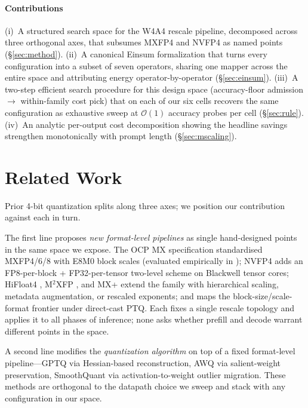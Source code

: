 \documentclass[conference]{IEEEtran}
\begin{document}
\paragraph*{Contributions}
(i)~A structured search space for the W4A4 rescale pipeline,
decomposed across three orthogonal axes, that subsumes MXFP4 and
NVFP4 as named points (\S\ref{sec:method}).
(ii)~A canonical Einsum formalization that turns every
configuration into a subset of seven operators, sharing one
mapper across the entire space and attributing energy
operator-by-operator (\S\ref{sec:einsum}).
(iii)~A two-step efficient search procedure for this design space
(accuracy-floor admission $\to$ within-family cost pick) that
on each of our six cells recovers the same configuration as
exhaustive sweep at $\mathcal{O}(1)$ accuracy probes per cell
(\S\ref{sec:rule}).
(iv)~An analytic per-output cost decomposition showing the
headline savings strengthen monotonically with prompt length
(\S\ref{sec:mscaling}).

\section{Related Work}
\label{sec:related}

Prior 4-bit quantization splits along three axes; we position our
contribution against each in turn.

The first line proposes \emph{new format-level pipelines} as
single hand-designed points in the same space we expose.  The
OCP MX specification \cite{mxfp4} standardised MXFP4/6/8 with
E8M0 block scales (evaluated empirically in
\cite{microscaling-eval}); NVFP4 \cite{nvfp4} adds an
FP8-per-block + FP32-per-tensor two-level scheme on Blackwell
tensor cores; HiFloat4 \cite{hifloat4}, M$^2$XFP \cite{m2xfp},
and MX+ \cite{mxplus} extend the family with hierarchical
scaling, metadata augmentation, or rescaled exponents; and
\cite{isfiner} maps the block-size/scale-format frontier under
direct-cast PTQ.  Each fixes a single rescale topology and
applies it to all phases of inference; none asks whether
prefill and decode warrant different points in the space.

A second line modifies the \emph{quantization algorithm} on top
of a fixed format-level pipeline---GPTQ \cite{gptq} via
Hessian-based reconstruction, AWQ \cite{awq} via
salient-weight preservation, SmoothQuant \cite{smoothquant} via
activation-to-weight outlier migration.  These methods are
orthogonal to the datapath choice we sweep and stack with any
configuration in our space.
\end{document}
